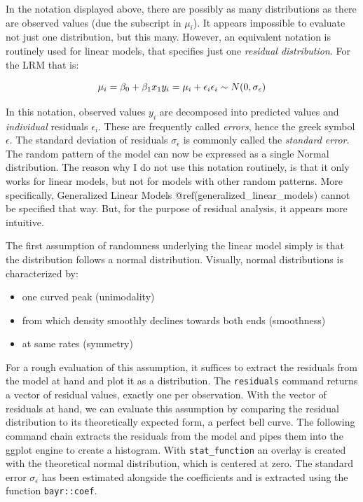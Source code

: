 \documentclass[]{svmono}
\providecommand{\tightlist}{%
  \setlength{\itemsep}{0pt}\setlength{\parskip}{0pt}}
\begin{document}
In the notation displayed above, there are possibly as many
distributions as there are observed values (due the subscript in
\(\mu_i\)). It appears impossible to evaluate not just one distribution,
but this many. However, an equivalent notation is routinely used for
linear models, that specifies just one \emph{residual distribution}. For
the LRM that is:

\[
\mu_i = \beta_0 + \beta_1x_1\\
y_i = \mu_i + \epsilon_i\\
\epsilon_i \sim N(0, \sigma_\epsilon)
\]

In this notation, observed values \(y_i\) are decomposed into predicted
values and \emph{individual} residuals \(\epsilon_i\). These are
frequently called \emph{errors}, hence the greek symbol \(\epsilon\).
The standard deviation of residuals \(\sigma_\epsilon\) is commonly
called the \emph{standard error}. The random pattern of the model can
now be expressed as a single Normal distribution. The reason why I do
not use this notation routinely, is that it only works for linear
models, but not for models with other random patterns. More
specifically, Generalized Linear Models
@ref(generalized\_linear\_models) cannot be specified that way. But, for
the purpose of residual analysis, it appears more intuitive.

The first assumption of randomness underlying the linear model simply is
that the distribution follows a normal distribution. Visually, normal
distributions is characterized by:

\begin{itemize}
\tightlist
\item
  one curved peak (unimodality)
\item
  from which density smoothly declines towards both ends (smoothness)
\item
  at same rates (symmetry)
\end{itemize}

For a rough evaluation of this assumption, it suffices to extract the
residuals from the model at hand and plot it as a distribution. The
\texttt{residuals} command returns a vector of residual values, exactly
one per observation. With the vector of residuals at hand, we can
evaluate this assumption by comparing the residual distribution to its
theoretically expected form, a perfect bell curve. The following command
chain extracts the residuals from the model and pipes them into the
ggplot engine to create a histogram. With \texttt{stat\_function} an
overlay is created with the theoretical normal distribution, which is
centered at zero. The standard error \(\sigma_\epsilon\) has been
estimated alongside the coefficients and is extracted using the function
\texttt{bayr::coef}.
\end{document}
